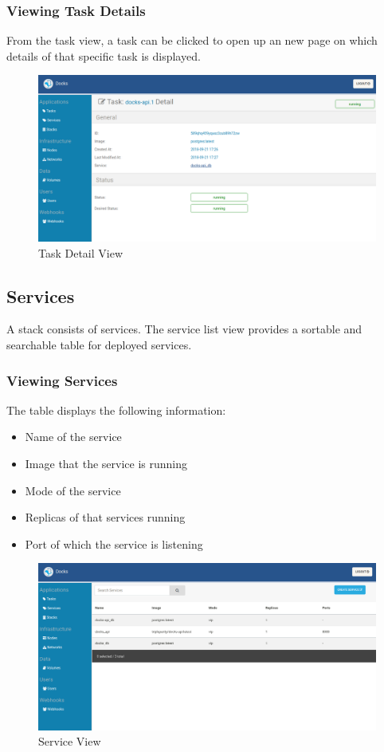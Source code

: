 \documentclass[]{article}
\providecommand{\tightlist}{%
	\setlength{\itemsep}{0pt}\setlength{\parskip}{0pt}}
\begin{document}
\subsubsection{Viewing Task Details}
From the task view, a task can be clicked to open up an new page
on which details of that specific task is displayed.

\begin{figure}[H]
	\centering
	\includegraphics[scale=0.4]{task_details.png}
	\caption{Task Detail View}
\end{figure}

\subsection{Services}
A stack consists of services. The service list view provides a sortable 
and searchable table for deployed services.

\subsubsection{Viewing Services}
The table displays the following information:
\begin{itemize}
	\tightlist
	\item Name of the service
	\item Image that the service is running
	\item Mode of the service
	\item Replicas of that services running
	\item Port of which the service is listening
\end{itemize}

\begin{figure}[H]
	\centering
	\includegraphics[scale=0.4]{services.png}
	\caption{Service View}
\end{figure}
\end{document}
